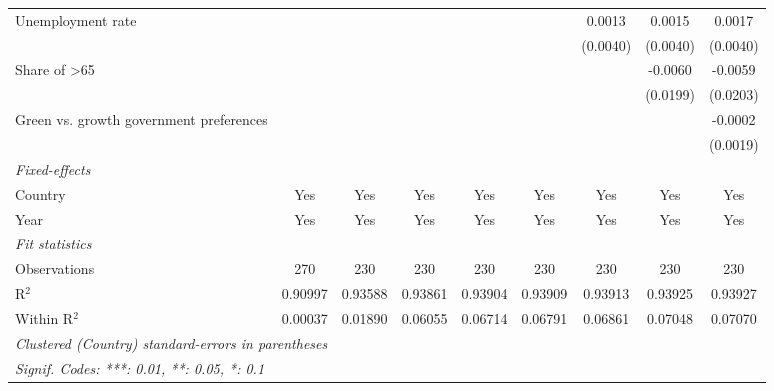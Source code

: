 \begin{table}[htbp]
\begin{tabular}{lcccccccc}
      Unemployment rate                       &          &          &                &                &                & 0.0013         & 0.0015         & 0.0017\\   
                                              &          &          &                &                &                & (0.0040)       & (0.0040)       & (0.0040)\\   
      Share of >65                            &          &          &                &                &                &                & -0.0060        & -0.0059\\   
                                              &          &          &                &                &                &                & (0.0199)       & (0.0203)\\   
      Green vs. growth government preferences &          &          &                &                &                &                &                & -0.0002\\   
                                              &          &          &                &                &                &                &                & (0.0019)\\   
      \midrule
      \emph{Fixed-effects}\\
      Country                                 & Yes      & Yes      & Yes            & Yes            & Yes            & Yes            & Yes            & Yes\\  
      Year                                    & Yes      & Yes      & Yes            & Yes            & Yes            & Yes            & Yes            & Yes\\  
      \midrule
      \emph{Fit statistics}\\
      Observations                            & 270      & 230      & 230            & 230            & 230            & 230            & 230            & 230\\  
      R$^2$                                   & 0.90997  & 0.93588  & 0.93861        & 0.93904        & 0.93909        & 0.93913        & 0.93925        & 0.93927\\  
      Within R$^2$                            & 0.00037  & 0.01890  & 0.06055        & 0.06714        & 0.06791        & 0.06861        & 0.07048        & 0.07070\\  
      \midrule \midrule
      \multicolumn{9}{l}{\emph{Clustered (Country) standard-errors in parentheses}}\\
      \multicolumn{9}{l}{\emph{Signif. Codes: ***: 0.01, **: 0.05, *: 0.1}}\\
   \end{tabular}
\end{table}


